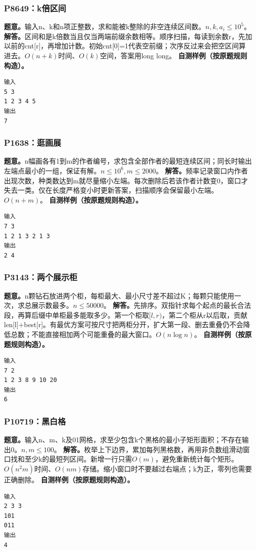 \subsubsection{P8649：k倍区间}
\textbf{题意。}输入n、k和n项正整数，求和能被k整除的非空连续区间数。$n,k,a_i\le10^5$。
\textbf{解答。}区间和是k倍数当且仅当两端前缀余数相等。顺序扫描，每读到余数r，先加以前的cnt[r]，再增加计数。初始cnt[0]=1代表空前缀；次序反过来会把空区间算进去。$O(n+k)$时间、$O(k)$空间，答案用long long。
\textbf{自测样例（按原题规则构造）。}
\begin{verbatim}
输入
5 3
1 2 3 4 5
输出
7
\end{verbatim}

\subsubsection{P1638：逛画展}
\textbf{题意。}n幅画各有1到m的作者编号，求包含全部作者的最短连续区间；同长时输出左端点最小的一组，保证有解。$n\le10^6,m\le2000$。
\textbf{解答。}频率记录窗口内作者出现次数，种类数达到m就尽量缩小左端。每次删除后若该作者计数变0，窗口才失去一类。仅在长度严格变小时更新答案，扫描顺序会保留最小左端。$O(n+m)$。
\textbf{自测样例（按原题规则构造）。}
\begin{verbatim}
输入
7 3
1 2 1 3 2 1 3
输出
2 4
\end{verbatim}

\subsubsection{P3143：两个展示柜}
\textbf{题意。}n颗钻石放进两个柜，每柜最大、最小尺寸差不超过K；每颗只能使用一次，求总展示数最多。$n\le50000$。
\textbf{解答。}先排序。双指针求每个起点的最长合法段，再算后缀中单柜最多能取多少。第一个柜取$[l,r)$，第二个柜从r以后取，贡献len[l]+best[r]。有最优方案可按尺寸把两柜分开，扩大第一段、删去重叠仍不会降低总数；不能直接相加两个可能重叠的最大窗口。$O(n\log n)$。
\textbf{自测样例（按原题规则构造）。}
\begin{verbatim}
输入
7 2
1 2 3 8 9 10 20
输出
6
\end{verbatim}

\subsubsection{P10719：黑白格}
\textbf{题意。}输入n、m、k及01网格，求至少包含k个黑格的最小子矩形面积；不存在输出0。$n,m\le100$。
\textbf{解答。}枚举上下边界，累加每列黑格数，再用非负数组滑动窗口找和至少k的最短列区间。新增一行只需$O(m)$，避免重新统计每个矩形。$O(n^2m)$时间、$O(nm)$存储。缩小窗口时不要越过右端点；k为正，零列也需要正确删除。
\textbf{自测样例（按原题规则构造）。}
\begin{verbatim}
输入
2 3 3
101
011
输出
4
\end{verbatim}

